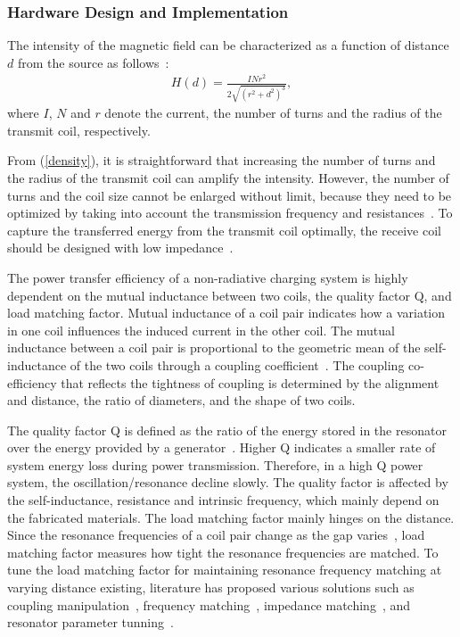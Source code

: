 \documentclass[twocolumn,10pt]{IEEEtran}
\begin{document}
 


\subsubsection{Hardware Design and Implementation}
The intensity of the magnetic field can be characterized as a function of distance $d$ from the source as follows~\cite{I.2013Mayordomo}:
\begin{eqnarray}\label{density}
	H(d)=\frac{INr^{2}}{2\sqrt{(r^{2}+d^{2})^{3}}}	,
\end{eqnarray}
where $I$, $N$ and $r$ denote the current, the number of turns and the radius of the transmit coil, respectively.

From (\ref{density}), it is straightforward that increasing the number of turns and the radius of the transmit coil can amplify the intensity. However, the number of turns and the coil size cannot be enlarged without limit, because they need to be optimized by taking into account the transmission frequency and resistances~\cite{I.2013Mayordomo}. To capture the transferred energy from the transmit coil optimally, the receive coil should be designed with low impedance~\cite{W.2012Kim}.  

The power transfer efficiency of a non-radiative charging system is highly dependent on the mutual inductance between two coils, the quality factor Q, and load matching factor. Mutual inductance of a coil pair indicates how a variation in one coil influences the induced current in the other coil. The mutual inductance between a coil pair is proportional to the geometric
mean of the self-inductance of the two coils 
through a coupling coefficient~\cite{W.2005Nilsson}. The coupling co-efficiency that reflects the tightness of coupling is determined by the alignment and distance, the ratio of diameters, and the shape of two coils. 

The quality factor Q is defined as the ratio of the energy stored in the resonator over the energy provided by a generator~\cite{T.2009Imura}. Higher Q indicates a smaller rate of system energy loss during power transmission. Therefore, in a high Q power system, the oscillation/resonance decline slowly. The quality factor is affected by the self-inductance, resistance and intrinsic frequency, which mainly depend on the fabricated materials. The load matching factor mainly hinges on the distance. Since the resonance frequencies of a coil pair change as the gap varies~\cite{T.2011Imura}, load matching factor measures how tight the resonance frequencies are matched. To tune the load matching factor for maintaining  resonance frequency matching at varying distance  existing, literature has proposed various solutions such as coupling manipulation~\cite{P.2011Duong}, frequency matching~\cite{P.2011Sample}, impedance matching~\cite{C.2010Beh}, and resonator parameter tunning~\cite{2010I.Awai}.
\end{document}
